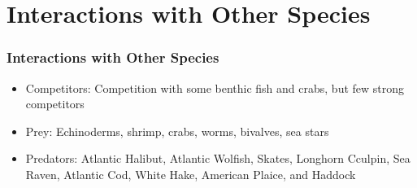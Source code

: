\documentclass{beamer}
\numberwithin{equation}{section}		%
\numberwithin{figure}{section}	   	%
\numberwithin{table}{section}				%
\newcommand{\yr}{2016}
\newcommand{\bd}{\string~/bio.data}   %
\newcommand{\bds}{\bd/bio.snowcrab}
\newcommand{\bdsa}{\bds/assessments}
\newcommand{\bdsay}{\bdsa/\yr}
\begin{document}
%
%
%
%	

\section{Interactions with Other Species}
\begin{frame}
\frametitle{Interactions with Other Species}

\begin{itemize}
	\item Competitors: Competition with some benthic fish and crabs, but few strong competitors
	\item Prey: Echinoderms, shrimp, crabs, worms, bivalves, sea stars
	\item Predators: Atlantic Halibut, Atlantic Wolfish, Skates, Longhorn Cculpin, Sea Raven, Atlantic Cod, White Hake, American Plaice, and Haddock
\end{itemize}
\end{frame}
\end{document}
